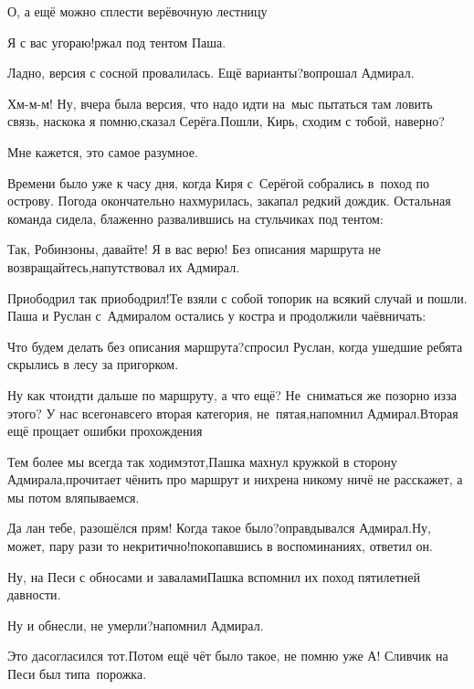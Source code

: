 \diagdash О, а ещё можно сплести верёвочную лестницу\myldots{}

\diagdash Я с вас угораю!\mdash ржал под тентом Паша.

\diagdash Ладно, версия с сосной провалилась. Ещё варианты?\mdash вопрошал Адмирал.

\diagdash Хм-м-м! Ну, вчера была версия, что надо идти на~мыс пытаться там ловить связь, наскока я помню,\mdash сказал Серёга.\mdash Пошли, Кирь, сходим с тобой, наверно?

\diagdash Мне кажется, это самое разумное.

Времени было уже к часу дня, когда Киря с~Серёгой собрались в~поход по острову. Погода окончательно нахмурилась, закапал редкий дождик. Остальная команда сидела, блаженно развалившись на стульчиках под тентом:

\diagdash Так, Робинзоны, давайте! Я в вас верю! Без описания маршрута не возвращайтесь,\mdash напутствовал их Адмирал.

\diagdash Приободрил так приободрил!\mdash Те взяли с собой топорик на всякий случай и пошли. Паша и Руслан с~Адмиралом остались у костра и продолжили чаёвничать:

\diagdash Что будем делать без описания маршрута?\mdash спросил Руслан, когда ушедшие ребята скрылись в лесу за пригорком.

\diagdash Ну как что\mdash идти дальше по маршруту, а что ещё? Не~сниматься же позорно из\sdash за этого? У нас всего\sdash навсего вторая категория, не~пятая,\mdash напомнил Адмирал.\mdash Вторая ещё прощает ошибки прохождения\myldots{}

\diagdash Тем более мы всегда так ходим\mdash этот,\mdash Пашка махнул кружкой в сторону Адмирала,\mdash прочитает чё\sdash нить про маршрут и нихрена никому ничё не расскажет, а мы потом вляпываемся.

\diagdash Да лан тебе, разошёлся прям! Когда такое было?\mdash оправдывался Адмирал.\mdash Ну, может, пару раз\mdash и то некритично!\mdash покопавшись в воспоминаниях, ответил он.

\diagdash Ну, на Песи с обносами и завалами\myldots{}\mdash Пашка вспомнил их поход пятилетней давности.

\diagdash Ну и обнесли, не умерли?\mdash напомнил Адмирал.

\diagdash Это да\myldots{}\mdash согласился тот.\mdash Потом ещё чёт было такое, не помню уже\myldots{} А! Сливчик на Песи был типа~порожка.

